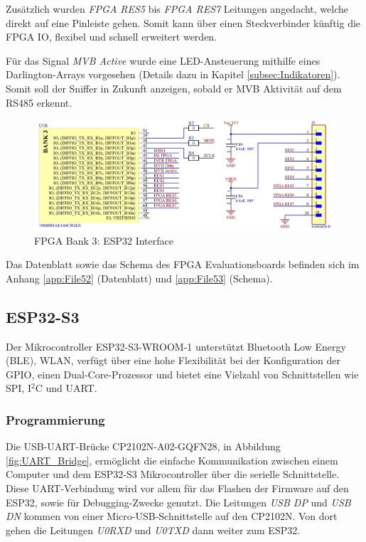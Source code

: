 Zusätzlich wurden \textit{FPGA RES5} bis \textit{FPGA RES7} Leitungen angedacht, welche direkt auf eine Pinleiste gehen. Somit kann über einen Steckverbinder künftig die FPGA IO, flexibel und schnell erweitert werden.

Für das Signal \textit{MVB Active} wurde eine LED-Ansteuerung mithilfe eines Darlington-Arrays vorgesehen (Details dazu in Kapitel \ref{subsec:Indikatoren}). Somit soll der Sniffer in Zukunft anzeigen, sobald er MVB Aktivität auf dem RS485 erkennt.

\begin{figure}[H]
    \centering
    \includegraphics[width=1.0\linewidth]{Figures/Chap3/Schematics/Bank3_ESP.png}
    \caption{FPGA Bank 3: ESP32 Interface}
    \label{FPGA ESP}
\end{figure}

Das Datenblatt sowie das Schema des FPGA Evaluationsboards befinden sich im Anhang \ref{app:File52} (Datenblatt) und \ref{app:File53} (Schema).

\subsection{ESP32-S3}
Der Mikrocontroller ESP32-S3-WROOM-1 unterstützt Bluetooth Low Energy (BLE), WLAN, verfügt über eine hohe Flexibilität bei der Konfiguration der GPIO, einen Dual-Core-Prozessor und bietet eine Vielzahl von Schnittstellen wie SPI, I$^2$C und UART.

\subsubsection{Programmierung}
Die USB-UART-Brücke CP2102N-A02-GQFN28, in Abbildung \ref{fig:UART_Bridge}, ermöglicht die einfache Kommunikation zwischen einem Computer und dem ESP32-S3 Mikrocontroller über die serielle Schnittstelle. Diese UART-Verbindung wird vor allem für das Flashen der Firmware auf den ESP32, sowie für Debugging-Zwecke genutzt. Die Leitungen \textit{USB DP} und \textit{USB DN} kommen von einer Micro-USB-Schnittstelle auf den CP2102N. Von dort gehen die Leitungen \textit{U0RXD} und \textit{U0TXD} dann weiter zum ESP32.


